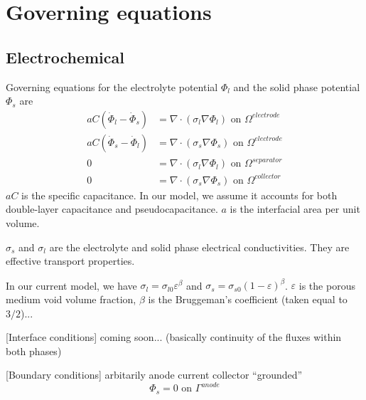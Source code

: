\documentclass[10pt, oneside]{article}   	%
\begin{document}
\section{Governing equations}
\subsection{Electrochemical}

Governing equations for the electrolyte potential $\Phi_l$ and the solid phase
potential $\Phi_s$ are
\begin{align}
aC (\dot{\Phi}_l - \dot{\Phi}_s) &= \nabla \cdot (\sigma_l \nabla \Phi_l) \text{ on } \Omega^{electrode} \\
aC (\dot{\Phi}_s - \dot{\Phi}_l) &= \nabla \cdot (\sigma_s \nabla \Phi_s) \text{ on } \Omega^{electrode} \\
0 &= \nabla \cdot (\sigma_l \nabla \Phi_l) \text{ on } \Omega^{separator} \\
0 &= \nabla \cdot (\sigma_s \nabla \Phi_s) \text{ on } \Omega^{collector}
\end{align}
$aC$ is the specific capacitance. In our model, we assume it accounts for both 
double-layer capacitance and pseudocapacitance. $a$ is the interfacial area
per unit volume.

$\sigma_s$ and $\sigma_l$ are the electrolyte and solid phase electrical
conductivities. They are effective transport properties.

In our current model, we have
$\sigma_l=\sigma_{l0}\varepsilon^\beta$ and
$\sigma_s=\sigma_{s0}(1-\varepsilon)^\beta$.
$\varepsilon$ is the porous medium void volume fraction,
$\beta$ is the Bruggeman's coefficient (taken equal to $3/2$)...

[Interface conditions]
coming soon... (basically continuity of the fluxes within both phases)

[Boundary conditions]
arbitarily anode current collector ``grounded''
\begin{equation}
\Phi_s = 0 \text{\ on\ } \Gamma^{anode}
\end{equation}
\end{document}
